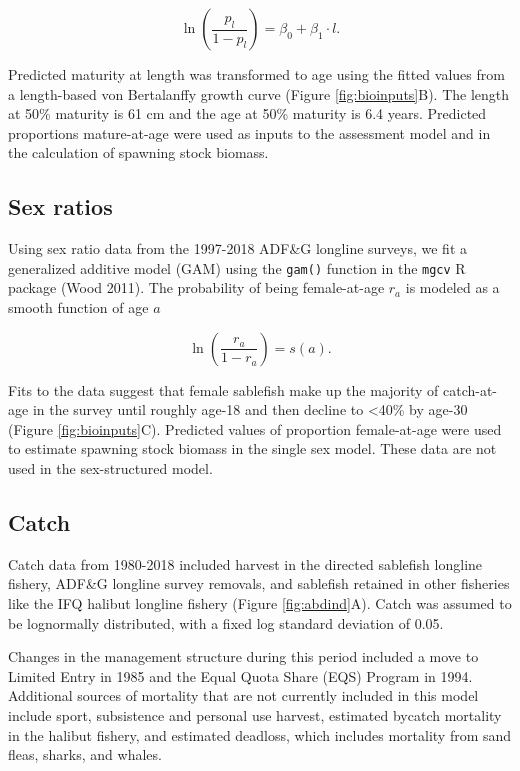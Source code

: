 \documentclass[]{article}
\begin{document}
\begin{equation}
\ln(\frac{p_l}{1-p_l})=\beta_0+\beta_1 \cdot l.
\label{eq:maturity}
\end{equation}

Predicted maturity at length was transformed to age using the fitted
values from a length-based von Bertalanffy growth curve (Figure
\ref{fig:bioinputs}B). The length at 50\% maturity is 61 cm and the age
at 50\% maturity is 6.4 years. Predicted proportions mature-at-age were
used as inputs to the assessment model and in the calculation of
spawning stock biomass.

\subsection{Sex ratios}\label{sex-ratios}

Using sex ratio data from the 1997-2018 ADF\&G longline surveys, we fit
a generalized additive model (GAM) using the \texttt{gam()} function in
the \texttt{mgcv} R package (Wood 2011). The probability of being
female-at-age \(r_a\) is modeled as a smooth function of age \(a\)

\begin{equation}
\ln(\frac{r_a}{1-r_a})=s(a).
\label{eq:sexratio}
\end{equation}

Fits to the data suggest that female sablefish make up the majority of
catch-at-age in the survey until roughly age-18 and then decline to
\textless{}40\% by age-30 (Figure \ref{fig:bioinputs}C). Predicted
values of proportion female-at-age were used to estimate spawning stock
biomass in the single sex model. These data are not used in the
sex-structured model.

\subsection{Catch}\label{catch}

Catch data from 1980-2018 included harvest in the directed sablefish
longline fishery, ADF\&G longline survey removals, and sablefish
retained in other fisheries like the IFQ halibut longline fishery
(Figure \ref{fig:abdind}A). Catch was assumed to be lognormally
distributed, with a fixed log standard deviation of 0.05.

Changes in the management structure during this period included a move
to Limited Entry in 1985 and the Equal Quota Share (EQS) Program in
1994. Additional sources of mortality that are not currently included in
this model include sport, subsistence and personal use harvest,
estimated bycatch mortality in the halibut fishery, and estimated
deadloss, which includes mortality from sand fleas, sharks, and whales.
\end{document}
